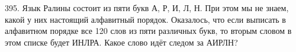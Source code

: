 395. Язык Ралины состоит из пяти букв А, Р, И, Л, Н. При этом мы не знаем, какой у них настоящий алфавитный порядок. Оказалось, что если выписать в алфавитном порядке все 120 слов из пяти различных букв, то вторым словом в этом списке будет ИНЛРА. Какое слово идёт следом за АИРЛН?\\
